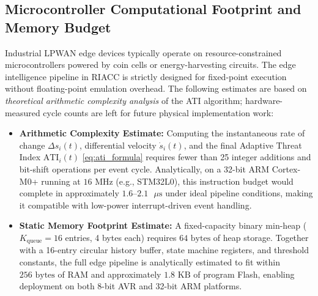 \documentclass[preprint,review,12pt]{elsarticle}
\begin{document}
\subsection{Microcontroller Computational Footprint and Memory Budget}
Industrial LPWAN edge devices typically operate on resource-constrained microcontrollers powered by coin cells or energy-harvesting circuits. The edge intelligence pipeline in RIACC is strictly designed for fixed-point execution without floating-point emulation overhead. The following estimates are based on \emph{theoretical arithmetic complexity analysis} of the ATI algorithm; hardware-measured cycle counts are left for future physical implementation work:
\begin{itemize}
    \item \textbf{Arithmetic Complexity Estimate:} Computing the instantaneous rate of change $\Delta s_i(t)$, differential velocity $\dot{s}_i(t)$, and the final Adaptive Threat Index $\text{ATI}_i(t)$ \eqref{eq:ati_formula} requires fewer than 25 integer additions and bit-shift operations per event cycle. Analytically, on a 32-bit ARM Cortex-M0+ running at $16\text{ MHz}$ (e.g., STM32L0), this instruction budget would complete in approximately $1.6\text{--}2.1\text{ }\mu\text{s}$ under ideal pipeline conditions, making it compatible with low-power interrupt-driven event handling.
    \item \textbf{Static Memory Footprint Estimate:} A fixed-capacity binary min-heap ($K_{\text{queue}} = 16$ entries, 4 bytes each) requires $64\text{ bytes}$ of heap storage. Together with a 16-entry circular history buffer, state machine registers, and threshold constants, the full edge pipeline is analytically estimated to fit within $256\text{ bytes}$ of RAM and approximately $1.8\text{ KB}$ of program Flash, enabling deployment on both 8-bit AVR and 32-bit ARM platforms.
\end{itemize}
\end{document}

